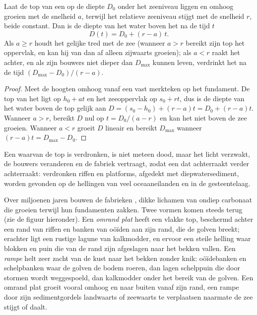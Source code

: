 \begin{proposition}\label{prop:b1:chemical-biogenic-sediments:keep-up}
Laat de top van een  op de diepte $D_0$ onder het zeeniveau liggen en omhoog groeien met de snelheid $a$, terwijl het relatieve zeeniveau stijgt met de snelheid $r$, beide constant. Dan is de diepte van het water boven het  na de tijd $t$
\[
D(t) = D_0 + (r - a)\,t .
\]
Als $a \ge r$ houdt het  gelijke tred met de zee (wanneer $a > r$ bereikt zijn top het oppervlak, en kan hij van dan af alleen zijwaarts groeien); als $a < r$ raakt het achter, en als zijn bouwers niet dieper dan $D_{\max}$ kunnen leven, verdrinkt het na de tijd $(D_{\max} - D_0)/(r - a)$.
\end{proposition}

\begin{proof}
Meet de hoogten omhoog vanaf een vast merkteken op het fundament. De top van het 
ligt op $h_0 + a t$ en het zeeoppervlak op $s_0 + r t$, dus is de diepte van het water boven
de top gelijk aan $D = (s_0 - h_0) + (r - a)t = D_0 + (r-a)t$. Wanneer $a > r$, bereikt $D$
nul op $t = D_0/(a-r)$ en kan het  niet boven de zee groeien. Wanneer
$a < r$ groeit $D$ lineair en bereikt $D_{\max}$ wanneer $(r-a)t = D_{\max} -
D_0$.
\end{proof}

Een  waarvan de top is verdronken, is niet meteen dood, maar het licht verzwakt, de bouwers veranderen en de fabriek vertraagt, zodat een  dat achterraakt verder achterraakt: verdronken riffen en platforms, afgedekt met diepwatersediment, worden gevonden op de hellingen van veel oceaaneilanden en in de gesteentelaag.

Over miljoenen jaren bouwen de fabrieken , dikke lichamen van ondiep carbonaat die groeien terwijl hun fundamenten zakken. Twee vormen komen steeds terug (zie de figuur hieronder). Een \emph{omrand plat} heeft een vlakke top, beschermd achter een rand van riffen en banken van oöïden aan zijn rand, die de golven breekt; erachter ligt een rustige lagune van kalkmodder, en ervoor een steile helling waar blokken en puin die van de rand zijn afgeslagen naar het bekken vallen. Een \emph{rampe} helt zeer zacht van de kust naar het bekken zonder knik: oöïdebanken en schelpbanken waar de golven de bodem roeren, dan lagen schelppuin die door stormen wordt weggespoeld, dan kalkmodder onder het bereik van de golven. Een omrand plat groeit vooral omhoog en naar buiten vanaf zijn rand, een rampe door zijn sedimentgordels landwaarts of zeewaarts te verplaatsen naarmate de zee stijgt of daalt.

